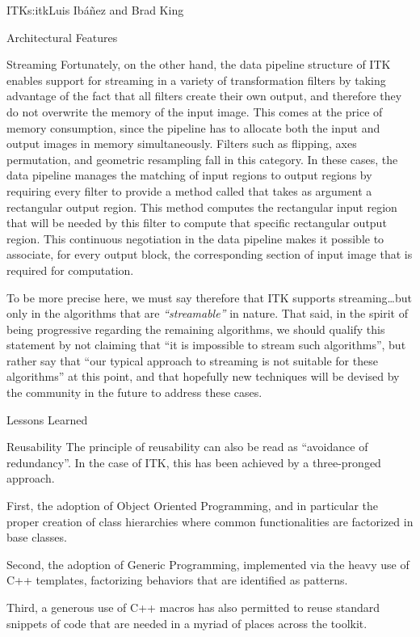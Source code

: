 \begin{aosachapter}{ITK}{s:itk}{Luis Ib\'{a}\~{n}ez and Brad King}
\begin{aosasect1}{Architectural Features}
\begin{aosasect2}{Streaming}
Fortunately, on the other hand, the data pipeline structure of ITK enables
support for streaming in a variety of transformation filters by taking
advantage of the fact that all filters create their own output, and therefore
they do not overwrite the memory of the input image. This comes at the price of
memory consumption, since the pipeline has to allocate both the input and
output images in memory simultaneously. Filters such as flipping, axes
permutation, and geometric resampling fall in this category. In these cases,
the data pipeline manages the matching of input regions to output regions by
requiring every filter to provide a method called
 that takes as argument a rectangular
output region. This method computes the rectangular input region that will be
needed by this filter to compute that specific rectangular output region. This
continuous negotiation in the data pipeline makes it possible to associate, for every
output block, the corresponding section of input image that is required for
computation.

To be more precise here, we must say therefore that ITK supports
streaming\ldots but only in the algorithms that are \emph{``streamable''} in
nature. That said, in the spirit of being progressive regarding the remaining
algorithms, we should qualify this statement by not claiming that ``it is
impossible to stream such algorithms'', but rather say that ``our typical
approach to streaming is not suitable for these algorithms'' at this point, and
that hopefully new techniques will be devised by the community in the future to
address these cases.
\end{aosasect2}

\end{aosasect1}

\begin{aosasect1}{Lessons Learned}

\begin{aosasect2}{Reusability}
The principle of reusability can also be read as ``avoidance of redundancy''.
In the case of ITK, this has been achieved by a three-pronged approach.

\begin{aosaitemize}
\item First, the adoption of Object Oriented Programming, and in particular the
proper creation of class hierarchies where common functionalities are
factorized in base classes.
\item Second, the adoption of Generic Programming, implemented via the heavy
use of C++ templates, factorizing behaviors that are identified as patterns.
\item Third, a generous use of C++ macros has also permitted to reuse standard
snippets of code that are needed in a myriad of places across the toolkit.
\end{aosaitemize}


\end{aosasect2}
\end{aosasect1}
\end{aosachapter}
